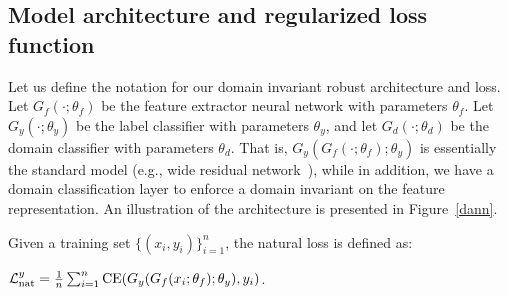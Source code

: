 





\subsection{Model architecture and regularized loss function}
\label{dial-loss-section}
Let us define the notation for our domain invariant robust architecture and loss. Let $G_f(\cdot;\theta_f)$ be the feature extractor neural network with parameters $\theta_f$. Let $G_y(\cdot;\theta_y)$ be the label classifier with parameters $\theta_y$, and let $G_d(\cdot;\theta_d)$ be the domain classifier with parameters $\theta_d$. 
That is, $G_y(G_f(\cdot;\theta_f);\theta_y)$ is essentially the standard model (e.g., wide residual network~\citep{zagoruyko2016wide}), while in addition, we have a domain classification layer to enforce a domain invariant on the feature representation. An illustration of the architecture is presented in Figure~\ref{dann}.

Given a training set $\{{(x_i,y_i)}\}_{i=1}^{n}$, the natural loss is defined as:
\begin{center}
$\mathcal{L}_{\operatorname{nat}}^y=\frac{1}{n}\sum_{i=1}^{n}{\text{CE}(G_y(G_f(x_i;\theta_f);\theta_y),y_i)}$. 
\end{center}


